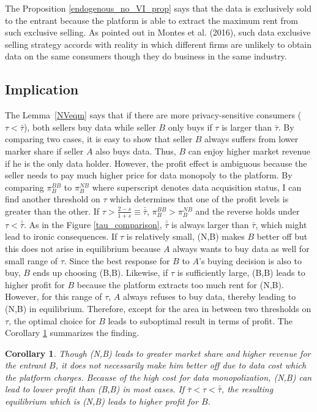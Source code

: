 \documentclass[12pt]{article}
\newtheorem{corollary}{Corollary}
\begin{document}
The Proposition \ref{endogenous_no_VI_prop} says that the data is exclusively sold to the entrant because the platform is able to extract the maximum rent from such exclusive selling. As pointed out in Montes et al. (2016), such data exclusive selling strategy accords with reality in which different firms are unlikely to obtain data on the same consumers though they do business in the same industry. 


\subsection{Implication}
The Lemma~\ref{NVeqm} says that if there are more privacy-sensitive consumers ($\tau<\bar{\tau}$), both sellers buy data while seller $B$ only buys if $\tau$ is larger than $\bar{\tau}$. By comparing two cases, it is easy to show that seller $B$ always suffers from lower marker share if seller $A$ also buys data. Thus, $B$ can enjoy higher market revenue if he is the only data holder. However, the profit effect is ambiguous because the seller needs to pay much higher price for data monopoly to the platform. By comparing $\pi_B^{BB}$ to $\pi_B^{NB}$ where superscript denotes data acquisition status, I can find another threshold on $\tau$ which determines that one of the profit levels is greater than the other. If $\tau > \frac{2-s}{1+s} \equiv\bar{\bar{\tau}}$, $\pi_B^{BB}>\pi_B^{NB}$ and the reverse holds under $\tau <\bar{\bar{\tau}}$. As in the Figure \ref{tau_comparison}, $\bar{\bar{\tau}}$ is always larger than $\bar{\tau}$, which might lead to ironic consequences. If $\tau$ is relatively small, (N,B) makes $B$ better off but this does not arise in equilibrium because $A$ always wants to buy data as well for small range of $\tau$. Since the best response for $B$ to $A$'s buying decision is also to buy, $B$ ends up choosing (B,B). Likewise, if $\tau$ is sufficiently large, (B,B) leads to higher profit for $B$ because the platform extracts too much rent for (N,B). However, for this range of $\tau$, $A$ always refuses to buy data, thereby leading to (N,B) in equilibrium. Therefore, except for the area in between two thresholds on $\tau$, the optimal choice for $B$ leads to suboptimal result in terms of profit. The Corollary \ref{NVtau} summarizes the finding.  

\begin{corollary}\label{NVtau}
Though (N,B) leads to greater market share and higher revenue for the entrant $B$, it does not necessarily make him better off due to data cost which the platform charges. Because of the high cost for data monopolization, (N,B) can lead to lower profit than (B,B) in most cases. If $\bar{\tau}<\tau<\bar{\bar{\tau}}$, the resulting equilibrium which is (N,B) leads to higher profit for $B$.
\end{corollary}
\end{document}
